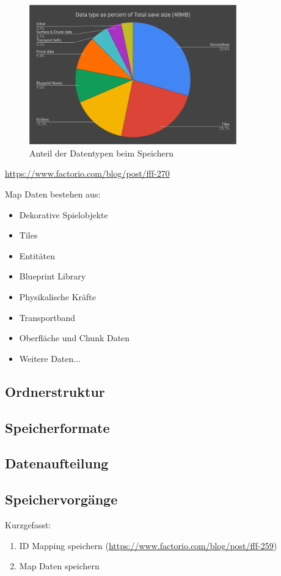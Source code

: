 \begin{figure}[htp]
    \centering
    \includegraphics[width=0.8\textwidth]{images/factorio_save_statistic.png}
    \caption{Anteil der Datentypen beim Speichern}
    \label{fig:factorioSaveStatistic}
\end{figure}
\url{https://www.factorio.com/blog/post/fff-270}

Map Daten bestehen aus:
\begin{itemize}
    \item Dekorative Spielobjekte 
    \item Tiles 
    \item Entitäten
    \item Blueprint Library
    \item Physikalische Kräfte
    \item Transportband
    \item Oberfläche und Chunk Daten
    \item Weitere Daten...
\end{itemize}

\subsection{Ordnerstruktur}

\subsection{Speicherformate}

\subsection{Datenaufteilung}

\subsection{Speichervorgänge}
Kurzgefasst:
\begin{enumerate}
    \item ID Mapping speichern (\url{https://www.factorio.com/blog/post/fff-259})
    \item Map Daten speichern
\end{enumerate}

